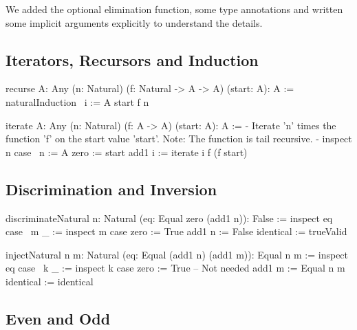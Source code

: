 We added the optional elimination function, some type annotations and written
some implicit arguments explicitly to understand the details.





\subsection{Iterators, Recursors and Induction}

\begin{alba}
    recurse {A: Any} (n: Natural) (f: Natural -> A -> A) (start: A): A :=
        naturalInduction
            {\ i := A}
            start
            f
            {n}

    iterate {A: Any} (n: Natural) (f: A -> A) (start: A): A :=
        {- Iterate 'n' times the function 'f' on the start value 'start'.
           Note: The function is tail recursive. -}
        inspect n case
            {\ n := A}
            zero :=
                start
            add1 i :=
                iterate i f (f start)
\end{alba}






\vskip 5mm
\subsection{Discrimination and Inversion}


\begin{alba}
    discriminateNatural {n: Natural} (eq: Equal zero (add1 n)): False :=
        inspect eq case
            { \ {m} _ :=
                inspect m case
                    zero :=
                        True
                    add1 n :=
                        False
            }
            identical :=
                trueValid


    injectNatural {n m: Natural} (eq: Equal (add1 n) (add1 m)): Equal n m :=
        inspect eq case
            { \ {k} _ :=
                inspect k case
                    zero :=
                        True  -- Not needed
                    add1 m :=
                        Equal n m}
            identical :=
                identical
\end{alba}







\vskip 5mm
\subsection{Even and Odd}




